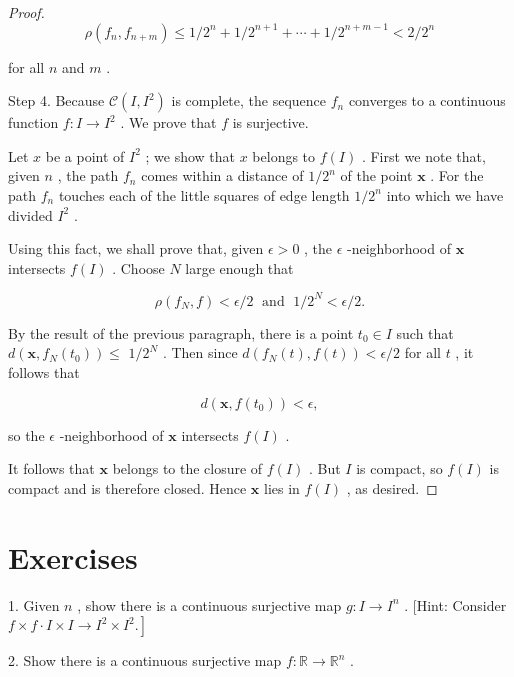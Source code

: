 \begin{proof}
\[
\rho \left( {{f}_{n},{f}_{n + m}}\right)  \leq  1/{2}^{n} + 1/{2}^{n + 1} + \cdots  + 1/{2}^{n + m - 1} < 2/{2}^{n}
\]

for all \(n\) and \(m\) .

Step 4. Because \(\mathcal{C}\left( {I,{I}^{2}}\right)\) is complete, the sequence \({f}_{n}\) converges to a continuous function \(f : I \rightarrow  {I}^{2}\) . We prove that \(f\) is surjective.

Let \(x\) be a point of \({I}^{2}\) ; we show that \(x\) belongs to \(f\left( I\right)\) . First we note that, given \(n\) , the path \({f}_{n}\) comes within a distance of \(1/{2}^{n}\) of the point \(\mathbf{x}\) . For the path \({f}_{n}\) touches each of the little squares of edge length \(1/{2}^{n}\) into which we have divided \({I}^{2}\) .

Using this fact, we shall prove that, given \(\epsilon  > 0\) , the \(\epsilon\) -neighborhood of \(\mathbf{x}\) intersects \(f\left( I\right)\) . Choose \(N\) large enough that

\[
\rho \left( {{f}_{N},f}\right)  < \epsilon /2\;\text{ and }\;1/{2}^{N} < \epsilon /2.
\]

By the result of the previous paragraph, there is a point \({t}_{0} \in  I\) such that \(d\left( {\mathbf{x},{f}_{N}\left( {t}_{0}\right) }\right)  \leq\)  \(1/{2}^{N}\) . Then since \(d\left( {{f}_{N}\left( t\right) ,f\left( t\right) }\right)  < \epsilon /2\) for all \(t\) , it follows that

\[
d\left( {\mathbf{x},f\left( {t}_{0}\right) }\right)  < \epsilon ,
\]

so the \(\epsilon\) -neighborhood of \(\mathbf{x}\) intersects \(f\left( I\right)\) .

It follows that \(\mathbf{x}\) belongs to the closure of \(f\left( I\right)\) . But \(I\) is compact, so \(f\left( I\right)\) is compact and is therefore closed. Hence \(\mathbf{x}\) lies in \(f\left( I\right)\) , as desired.
\end{proof}
\section*{Exercises}

1. Given \(n\) , show there is a continuous surjective map \(g : I \rightarrow  {I}^{n}\) . [Hint: Consider \(\left. {f \times  f \cdot  I \times  I \rightarrow  {I}^{2} \times  {I}^{2}.}\right\rbrack\)

2. Show there is a continuous surjective map \(f : \mathbb{R} \rightarrow  {\mathbb{R}}^{n}\) .

